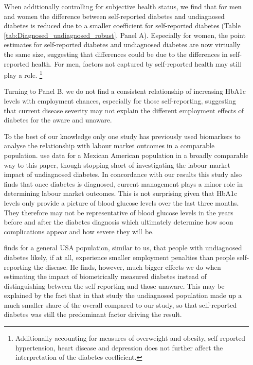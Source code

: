When additionally controlling for subjective health status, we find that for men and women the difference between self-reported diabetes and undiagnosed diabetes is reduced due to a smaller coefficient for self-reported diabetes (Table \ref{tab:Diagnosed_undiagnosed_robust}, Panel A). Especially for women, the point estimates for self-reported diabetes and undiagnosed diabetes are now virtually the same size, suggesting that differences could be due to the differences in self-reported health. For men, factors not captured by self-reported health may still play a role. \footnote{Additionally accounting for measures of overweight and obesity, self-reported hypertension, heart disease and depression does not further affect the interpretation of the diabetes coefficient.}

Turning to Panel B, we do not find a consistent relationship of increasing \ac{HbA1c} levels with employment chances, especially for those self-reporting, suggesting that current disease severity may not explain the different employment effects of diabetes for the aware and unaware.

To the best of our knowledge only one study has previously used biomarkers to analyse the relationship with labour market outcomes in a comparable population. \textcite{BrownIII2011} use data for a Mexican American population in a broadly comparable way to this paper, though stopping short of investigating the labour market impact of undiagnosed diabetes. In concordance with our results this study also finds that once diabetes is diagnosed, current management plays a minor role in determining labour market outcomes. This is not surprising given that \ac{HbA1c} levels only provide a picture of blood glucose levels over the last three months. They therefore may not be representative of blood glucose levels in the years before and after the diabetes diagnosis which ultimately determine how soon complications appear and how severe they will be.

\parencite{Minor2015} finds for a general USA population, similar to us, that people with undiagnosed diabetes likely, if at all, experience smaller employment penalties than people self-reporting the disease. He finds, however, much bigger effects \DIFdelbegin {}\DIFdelend \DIFaddbegin {}\DIFaddend we do when estimating the impact of biometrically measured diabetes instead of distinguishing between the self-reporting and those unaware. This may be explained by the fact that in that study the undiagnosed population made up a much smaller share of the overall \DIFdelbegin {}\DIFdelend \DIFaddbegin {}\DIFaddend compared to our study, so that self-reported diabetes was still the predominant factor driving the result.  


